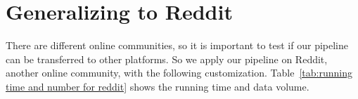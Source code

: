 \documentclass{article} %
\newcommand{\diyi}[1]{\textcolor{blue}{[#1 --diyi]}}
\begin{document}
\vspace{-1em}
\section{Generalizing to Reddit}
\label{sec:generalizability}
There are different online communities, so it is important to test if our pipeline can be transferred to other  platforms. So we apply our pipeline on Reddit, another online community, with the following customization. Table~\ref{tab:running time and number for reddit} shows the running time and data volume. 
\end{document}

